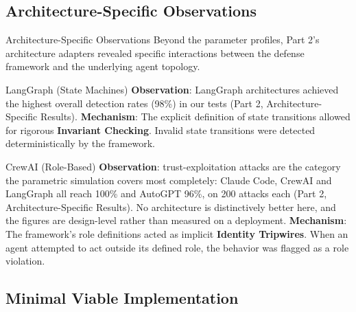 \documentclass[
  ignorenonframetext,
]{beamer}
\begin{document}
\begin{frame}
\end{frame}

\subsection{Architecture-Specific
Observations}\label{architecture-specific-observations}

\begin{frame}[allowframebreaks]{Architecture-Specific Observations}
Beyond the parameter profiles, Part 2's architecture adapters revealed
specific interactions between the defense framework and the underlying
agent topology.
\end{frame}

\begin{frame}[allowframebreaks]{LangGraph (State Machines)}
\protect{}\label{langgraph-state-machines}
\textbf{Observation}: LangGraph architectures achieved the highest
overall detection rates (98\%) in our tests (Part 2,
Architecture-Specific Results). \textbf{Mechanism}: The explicit
definition of state transitions allowed for rigorous \textbf{Invariant
Checking}. Invalid state transitions were detected deterministically by
the framework.
\end{frame}

\begin{frame}[allowframebreaks]{CrewAI (Role-Based)}
\protect{}\label{crewai-role-based}
\textbf{Observation}: trust-exploitation attacks are the category the
parametric simulation covers most completely: Claude Code, CrewAI and
LangGraph all reach 100\% and AutoGPT 96\%, on 200 attacks each (Part 2,
Architecture-Specific Results). No architecture is distinctively better
here, and the figures are design-level rather than measured on a
deployment. \textbf{Mechanism}: The framework's role definitions acted
as implicit \textbf{Identity Tripwires}. When an agent attempted to act
outside its defined role, the behavior was flagged as a role violation.
\end{frame}

\begin{frame}
\end{frame}

\subsection{Minimal Viable
Implementation}\label{minimal-viable-implementation}
\end{document}
